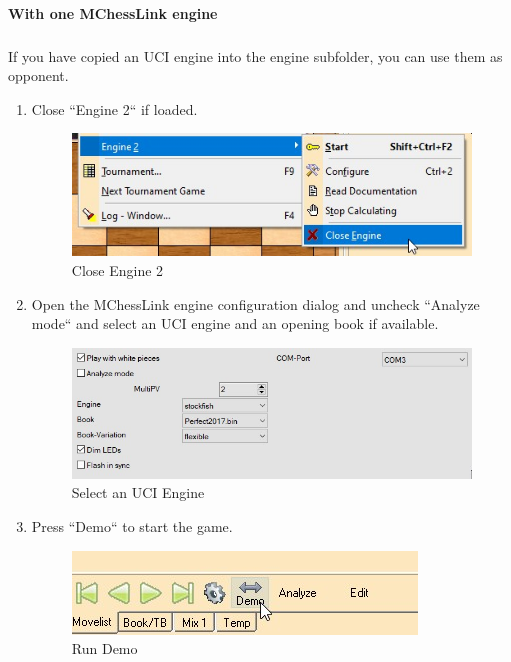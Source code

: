 \documentclass[11pt,a4paper]{article}
\begin{document}
\paragraph{With one MChessLink engine}
\subparagraph{} If you have copied an UCI engine into the engine subfolder, you can use them as opponent.
\begin{enumerate}
	\item Close ``Engine 2`` if loaded.
	\begin{figure}[H]
		\centering
		\includegraphics[scale=0.7]{arena_closeengine2.jpg}
		\caption{Close Engine 2}
		\label{fig:ArenaCloseEngine2}
	\end{figure}
    \item Open the MChessLink engine configuration dialog and uncheck ``Analyze mode`` and select an UCI engine and an opening book if available.
    	\begin{figure}[H]
    	\centering
    	\includegraphics[scale=0.7]{arena_ConfigureMChessLink2.jpg}
    	\caption{Select an UCI Engine}
    	\label{fig:ArenaConfigureCertabo2}
    \end{figure}
    \item Press ``Demo`` to start the game.
    \begin{figure}[H]
    	\centering
    	\includegraphics[scale=0.7]{arena_demo.jpg}
    	\caption{Run Demo}
    	\label{fig:ArenaDemo}
    \end{figure}
\end{enumerate}
\end{document}
